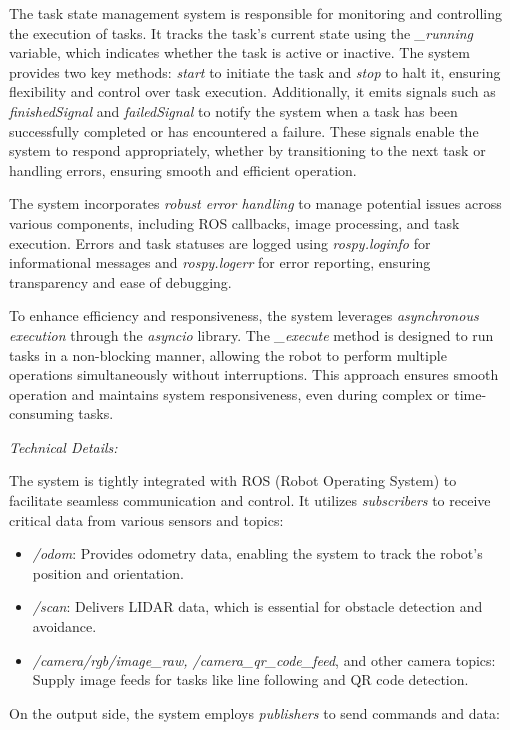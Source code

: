 \documentclass[../../main]{subfiles}
\begin{document}
The task state management system is responsible for monitoring and
controlling the execution of tasks. It tracks the task's current state
using the \emph{\_running} variable, which indicates whether the task is
active or inactive. The system provides two key methods: \emph{start} to
initiate the task and \emph{stop} to halt it, ensuring flexibility and
control over task execution. Additionally, it emits signals such as
\emph{finishedSignal} and \emph{failedSignal} to notify the system when
a task has been successfully completed or has encountered a failure.
These signals enable the system to respond appropriately, whether by
transitioning to the next task or handling errors, ensuring smooth and
efficient operation.

The system incorporates \emph{robust error handling} to manage potential
issues across various components, including ROS callbacks, image
processing, and task execution. Errors and task statuses are logged
using \emph{rospy.loginfo} for informational messages and
\emph{rospy.logerr} for error reporting, ensuring transparency and ease
of debugging.

To enhance efficiency and responsiveness, the system leverages
\emph{asynchronous execution} through the \emph{asyncio} library. The
\emph{\_execute} method is designed to run tasks in a non-blocking
manner, allowing the robot to perform multiple operations simultaneously
without interruptions. This approach ensures smooth operation and
maintains system responsiveness, even during complex or time-consuming
tasks.

\emph{Technical Details:}

The system is tightly integrated with ROS (Robot Operating System) to
facilitate seamless communication and control. It utilizes
\emph{subscribers} to receive critical data from various sensors and
topics:

\begin{itemize}
\item
  \emph{/odom}: Provides odometry data, enabling the system to track the
  robot's position and orientation.
\item
  \emph{/scan}: Delivers LIDAR data, which is essential for obstacle
  detection and avoidance.
\item
  \emph{/camera/rgb/image\_raw, /camera\_qr\_code\_feed}, and other
  camera topics: Supply image feeds for tasks like line following and QR
  code detection.
\end{itemize}

On the output side, the system employs \emph{publishers} to send
commands and data:
\end{document}
